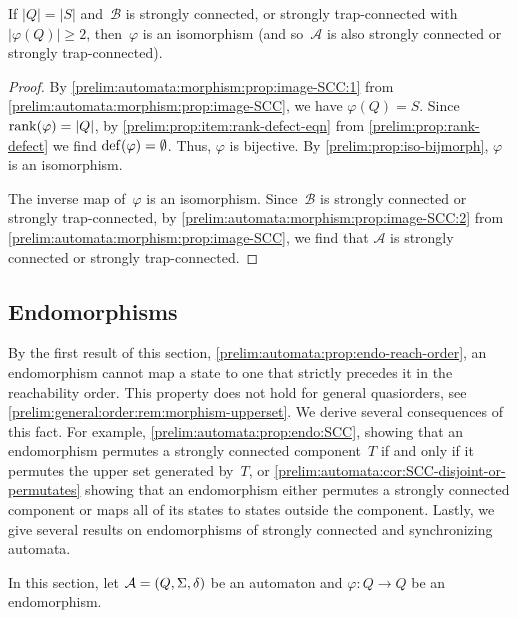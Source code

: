 \begin{corollary} \label{prelim:automata:morphism:cor:image-SCC}
	If $|Q| = |S|$ and~$\mathcal B$ is strongly connected,
	or strongly trap-connected with $|\varphi(Q)| \ge 2$,
	then~$\varphi$ is an isomorphism (and so~$\mathcal A$ is also strongly connected or strongly trap-connected).
\end{corollary}
\begin{proof}
	By \cref{prelim:automata:morphism:prop:image-SCC:1} from \cref{prelim:automata:morphism:prop:image-SCC}, 
	we have $\varphi(Q) = S$.
	Since $\operatorname{rank}(\varphi) = |Q|$,
	by \cref{prelim:prop:item:rank-defect-eqn}
	from \cref{prelim:prop:rank-defect} we find $\operatorname{def}(\varphi) = \emptyset$.
	Thus, $\varphi$ is bijective.
	By \cref{prelim:prop:iso-bijmorph}, $\varphi$ is an isomorphism.
	
	The inverse map of~$\varphi$ is an isomorphism.
	Since~$\mathcal B$ is strongly connected or strongly trap-connected,
	by \cref{prelim:automata:morphism:prop:image-SCC:2} from \cref{prelim:automata:morphism:prop:image-SCC},
	we find that $\mathcal A$ is strongly connected
	or strongly trap-connected.		
\end{proof}

\subsection{Endomorphisms}
\label{prelim:sec:endo}

By the first result of this section, \cref{prelim:automata:prop:endo-reach-order},
an endomorphism cannot map a state to one that strictly precedes it in the
reachability order.
This property
does not hold for general quasiorders, see \cref{prelim:general:order:rem:morphism-upperset}.
We derive several consequences of this fact. For example,
\cref{prelim:automata:prop:endo:SCC}, showing that an endomorphism permutes a
strongly connected component~$T$ if and only if it permutes the upper set
generated by~$T$, or
\cref{prelim:automata:cor:SCC-disjoint-or-permutates} showing that an
endomorphism either permutes a strongly connected component or maps all of
its states to states outside the component.
Lastly, we give several results on endomorphisms of strongly connected
and synchronizing automata.

In this section, let $\mathcal A = (Q, \Sigma, \delta)$ be an automaton and $\varphi \colon Q \to Q$ be an endomorphism. 

